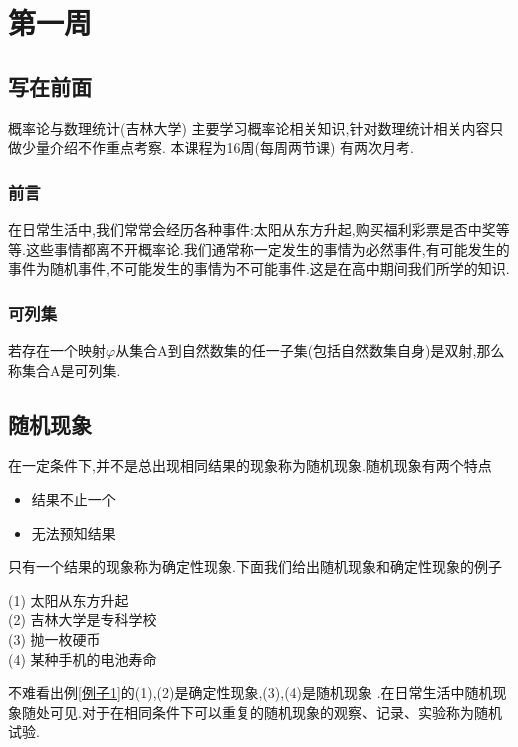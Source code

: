 \section{第一周}
\subsection{写在前面}
概率论与数理统计(吉林大学) 主要学习概率论相关知识,针对数理统计相关内容只做少量介绍不作重点考察.
本课程为16周(每周两节课) 有两次月考.
\subsubsection*{前言}
在日常生活中,我们常常会经历各种事件:太阳从东方升起,购买福利彩票是否中奖等等.这些事情都离不开概率论.我们通常称一定发生的事情为必然事件,有可能发生的事件为随机事件,不可能发生的事情为不可能事件.这是在高中期间我们所学的知识.
\subsubsection*{可列集}
若存在一个映射\(\varphi\)从集合A到自然数集的任一子集(包括自然数集自身)是双射,那么称集合A是可列集.
\subsection{随机现象}
在一定条件下,并不是总出现相同结果的现象称为随机现象.随机现象有两个特点
\begin{itemize}
    \item 结果不止一个 \\
    \item 无法预知结果
\end{itemize}
只有一个结果的现象称为确定性现象.下面我们给出随机现象和确定性现象的例子
\begin{Example}\label{例子1}
    (1) 太阳从东方升起 \\
    (2) 吉林大学是专科学校 \\
    (3) 抛一枚硬币 \\
    (4) 某种手机的电池寿命 
\end{Example}
不难看出例\ref{例子1}的(1),(2)是确定性现象,(3),(4)是随机现象 .在日常生活中随机现象随处可见.对于在相同条件下可以重复的随机现象的观察、记录、实验称为随机试验. 
